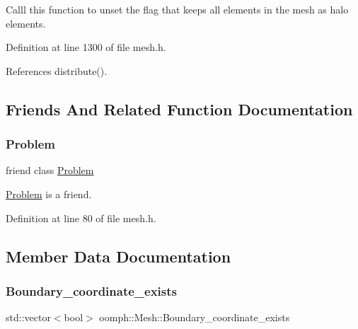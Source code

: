 Calll this function to unset the flag that keeps all elements in the mesh as halo elements. 



Definition at line 1300 of file mesh.\+h.



References distribute().



\subsection{Friends And Related Function Documentation}
\mbox{\label{classoomph_1_1Mesh_acc081cc87e465ee811f25f9676550d09}} 
\subsubsection{\texorpdfstring{Problem}{Problem}}
{\footnotesize\ttfamily friend class \hyperlink{classoomph_1_1Problem}{Problem}\hspace{0.3cm}{\ttfamily [friend]}}



\hyperlink{classoomph_1_1Problem}{Problem} is a friend. 



Definition at line 80 of file mesh.\+h.



\subsection{Member Data Documentation}
\mbox{\label{classoomph_1_1Mesh_a412a5051be9e81f0ba61bf85e5abc4a6}} 
\subsubsection{\texorpdfstring{Boundary\+\_\+coordinate\+\_\+exists}{Boundary\_coordinate\_exists}}
{\footnotesize\ttfamily std\+::vector$<$bool$>$ oomph\+::\+Mesh\+::\+Boundary\+\_\+coordinate\+\_\+exists\hspace{0.3cm}{\ttfamily [protected]}}



